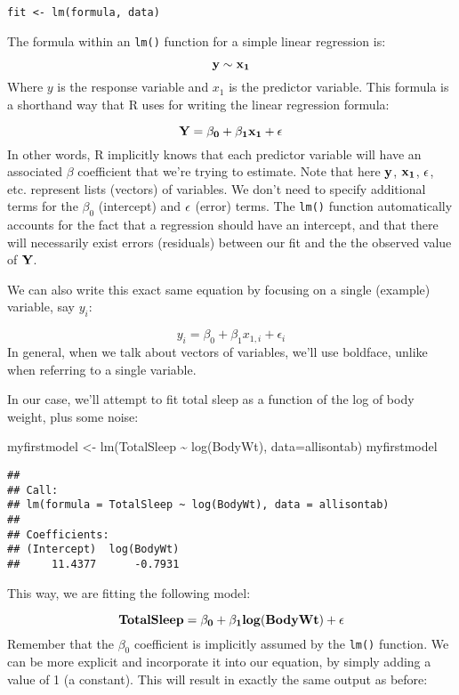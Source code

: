 \documentclass[
]{book}
\newenvironment{Shaded}{\begin{snugshade}}{\end{snugshade}}
\newcommand{\AttributeTok}[1]{\textcolor[rgb]{0.77,0.63,0.00}{#1}}
\newcommand{\FunctionTok}[1]{\textcolor[rgb]{0.00,0.00,0.00}{#1}}
\newcommand{\NormalTok}[1]{#1}
\newcommand{\OtherTok}[1]{\textcolor[rgb]{0.56,0.35,0.01}{#1}}
\newcommand{\SpecialCharTok}[1]{\textcolor[rgb]{0.00,0.00,0.00}{#1}}
\begin{document}
\texttt{fit\ \textless{}-\ lm(formula,\ data)}

The formula within an \texttt{lm()} function for a simple linear regression is:

\[\bf{y} \sim \bf{x_1}\]
Where \(y\) is the response variable and \(x_1\) is the predictor variable. This formula is a shorthand way that R uses for writing the linear regression formula:

\[\bf{Y} = \beta_0 + \beta_1 \bf{x_1} + \bf{\epsilon}\]
In other words, R implicitly knows that each predictor variable will have an associated \(\beta\) coefficient that we're trying to estimate. Note that here \(\bf{y}\), \(\bf{x_1}\), \(\bf{\epsilon}\), etc. represent lists (vectors) of variables. We don't need to specify additional terms for the \(\beta_0\) (intercept) and \(\bf{\epsilon}\) (error) terms. The \texttt{lm()} function automatically accounts for the fact that a regression should have an intercept, and that there will necessarily exist errors (residuals) between our fit and the the observed value of \(\bf{Y}\).

We can also write this exact same equation by focusing on a single (example) variable, say \(y_i\):

\[y_i = \beta_0 + \beta_1 x_{1,i} + \epsilon_i\]
In general, when we talk about vectors of variables, we'll use boldface, unlike when referring to a single variable.

In our case, we'll attempt to fit total sleep as a function of the log of body weight, plus some noise:

\begin{Shaded}
\begin{Highlighting}[]
\NormalTok{myfirstmodel }\OtherTok{\textless{}{-}} \FunctionTok{lm}\NormalTok{(TotalSleep }\SpecialCharTok{\textasciitilde{}} \FunctionTok{log}\NormalTok{(BodyWt), }\AttributeTok{data=}\NormalTok{allisontab) }
\NormalTok{myfirstmodel}
\end{Highlighting}
\end{Shaded}

\begin{verbatim}
## 
## Call:
## lm(formula = TotalSleep ~ log(BodyWt), data = allisontab)
## 
## Coefficients:
## (Intercept)  log(BodyWt)  
##     11.4377      -0.7931
\end{verbatim}

This way, we are fitting the following model:

\[\bf{TotalSleep} = \beta_0 + \beta_1 \bf{log(BodyWt)} + \bf{\epsilon}\]
Remember that the \(\beta_0\) coefficient is implicitly assumed by the \texttt{lm()} function. We can be more explicit and incorporate it into our equation, by simply adding a value of 1 (a constant). This will result in exactly the same output as before:
\end{document}
